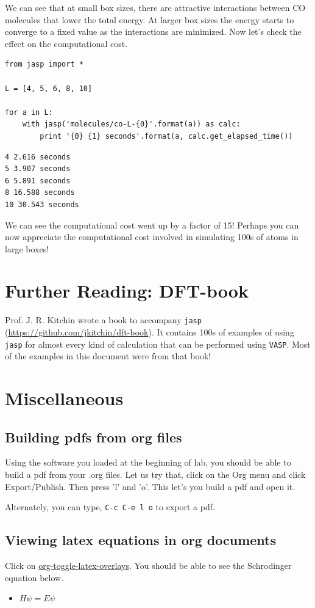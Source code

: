 \documentclass[11pt]{article}
\begin{document}
We can see that at small box sizes, there are attractive interactions between CO molecules that lower the total energy. At larger box sizes the energy starts to converge to a fixed value as the interactions are minimized. Now let's check the effect on the computational cost.

\begin{verbatim}
from jasp import *

L = [4, 5, 6, 8, 10]

for a in L:
    with jasp('molecules/co-L-{0}'.format(a)) as calc:
        print '{0} {1} seconds'.format(a, calc.get_elapsed_time())
\end{verbatim}

\begin{verbatim}
4 2.616 seconds
5 3.907 seconds
6 5.891 seconds
8 16.588 seconds
10 30.543 seconds
\end{verbatim}

We can see the computational cost went up by a factor of 15! Perhaps you can now appreciate the computational cost involved in simulating 100s of atoms in large boxes!



\section{Further Reading: DFT-book}
\label{sec-8}

Prof. J. R. Kitchin wrote a book to accompany \texttt{jasp} (\url{https://github.com/jkitchin/dft-book}). It contains 100s of examples of using \texttt{jasp} for almost every kind of calculation that can be performed using \texttt{VASP}. Most of the examples in this document were from that book!



\section{Miscellaneous}
\label{sec-9}

\subsection{Building pdfs from org files}
\label{sec-9-1}

Using the software you loaded at the beginning of lab, you should be able to build a pdf from your .org files. Let us try that, click on the Org menu and click Export/Publish. Then press 'l' and 'o'. This let's you build a pdf and open it.

Alternately, you can type, \verb~C-c C-e l o~ to export a pdf.


\subsection{Viewing latex equations in org documents}
\label{sec-9-2}

Click on \url{org-toggle-latex-overlays}. You should be able to see the Schrodinger equation below.

\begin{itemize}
\item $H\psi = E\psi$
\end{itemize}
\end{document}
